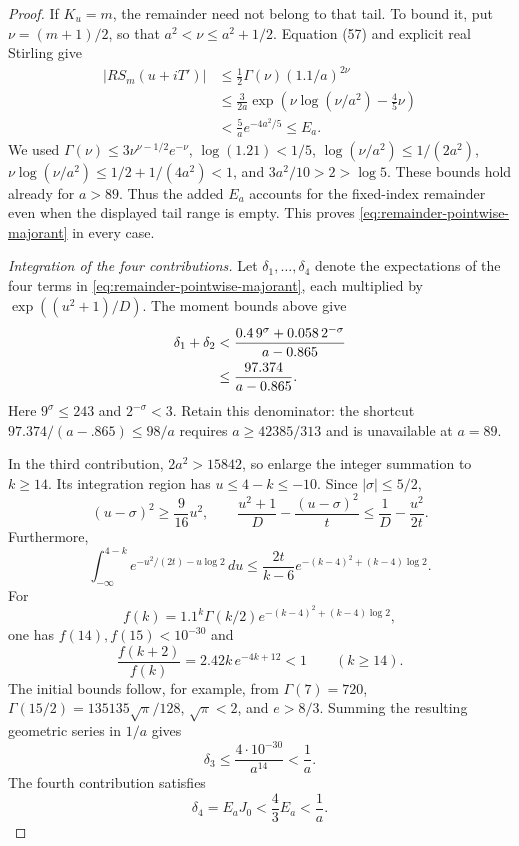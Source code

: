 \documentclass[11pt]{article}
\theoremstyle{remark}
\numberwithin{equation}{section}
\begin{document}
\begin{proof}
If $K_u=m$, the remainder need not belong to that tail.  To bound it,
put $\nu=(m+1)/2$, so that $a^2<\nu\le a^2+1/2$.
Equation (57) and explicit real Stirling give
\begin{align*}
 |RS_m(u+iT')|
 &\le\frac12\Gamma(\nu)(1.1/a)^{2\nu}\\
 &\le\frac3{2a}
     \exp\!\left(\nu\log(\nu/a^2)-\frac45\nu\right)\\
 &<\frac5a e^{-4a^2/5}\le E_a.
\end{align*}
We used
$\Gamma(\nu)\le3\nu^{\nu-1/2}e^{-\nu}$,
$\log(1.21)<1/5$, $\log(\nu/a^2)\le1/(2a^2)$,
$\nu\log(\nu/a^2)\le1/2+1/(4a^2)<1$, and
$3a^2/10>2>\log5$. These bounds hold already for $a>89$.
Thus the added $E_a$ accounts for the fixed-index
remainder even when the displayed tail range is empty.  This proves
\eqref{eq:remainder-pointwise-majorant} in every case.

\emph{Integration of the four contributions.}
Let $\delta_1,\ldots,\delta_4$ denote the expectations of the four
terms in \eqref{eq:remainder-pointwise-majorant}, each multiplied by
$\exp((u^2+1)/D)$.  The moment bounds above give
\begin{align}
 \delta_1+\delta_2
 &<\frac{0.4\,9^\sigma+0.058\,2^{-\sigma}}{a-0.865}\notag\\
 &\le\frac{97.374}{a-0.865}.
 \label{eq:remainder-first-two-deltas}
\end{align}
Here $9^\sigma\le243$ and $2^{-\sigma}<3$. Retain this denominator:
the shortcut $97.374/(a-.865)\le98/a$ requires $a\ge42385/313$
and is unavailable at $a=89$.

In the third contribution, $2a^2>15842$, so enlarge the integer
summation to $k\ge14$.
Its integration region has $u\le4-k\le-10$.  Since $|\sigma|\le5/2$,
\[
 (u-\sigma)^2\ge\frac9{16}u^2,
 \qquad
 \frac{u^2+1}{D}-\frac{(u-\sigma)^2}{t}
 \le\frac1D-\frac{u^2}{2t}.
\]
Furthermore,
\[
 \int_{-\infty}^{4-k}e^{-u^2/(2t)-u\log2}\,du
 \le\frac{2t}{k-6}
       e^{-(k-4)^2+(k-4)\log2}.
\]
For
\[
 f(k)=1.1^k\Gamma(k/2)
             e^{-(k-4)^2+(k-4)\log2},
\]
one has $f(14),f(15)<10^{-30}$ and
\[
 \frac{f(k+2)}{f(k)}=2.42k\,e^{-4k+12}<1
 \qquad(k\ge14).
\]
The initial bounds follow, for example, from
$\Gamma(7)=720$, $\Gamma(15/2)=135135\sqrt\pi/128$,
$\sqrt\pi<2$, and $e>8/3$.  Summing the resulting geometric series
in $1/a$ gives
\begin{equation}
 \label{eq:remainder-tail-delta}
 \delta_3\le\frac{4\cdot10^{-30}}{a^{14}}<\frac1a.
\end{equation}
The fourth contribution satisfies
\begin{equation}
 \label{eq:remainder-fixed-index-delta}
 \delta_4=E_aJ_0<\frac43 E_a<\frac1a.
\end{equation}


\end{proof}
\end{document}

